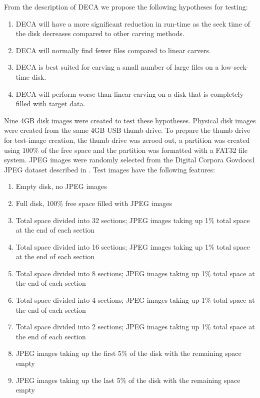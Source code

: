 \documentclass[final,5p,times,twocolumn,authoryear]{elsarticle}
\begin{document}
From the description of DECA we propose the following hypotheses for testing:
\begin{enumerate}
	\item DECA will have a more significant reduction in run-time as the seek time of the disk decreases compared to other carving methods.
	\item DECA will normally find fewer files compared to linear carvers.
	\item DECA is best suited for carving a small number of large files on a low-seek-time disk.
	\item DECA will perform worse than linear carving on a disk that is completely filled with target data.
\end{enumerate}

Nine 4GB disk images were created to test these hypotheses. Physical disk images were created from the same 4GB USB thumb drive. To prepare the thumb drive for test-image creation, the thumb drive was zeroed out, a partition was created using 100\% of the free space and the partition was formatted with a FAT32 file system. JPEG images were randomly selected from the Digital Corpora Govdocs1 JPEG dataset described in \cite{Garfinkel2009}. Test images have the following features:

\begin{enumerate}
	\item Empty disk, no JPEG images
	\item Full disk, 100\% free space filled with JPEG images
	\item Total space divided into 32 sections; JPEG images taking up 1\% total space at the end of each section
	\item Total space divided into 16 sections; JPEG images taking up 1\% total space at the end of each section
	\item Total space divided into 8 sections; JPEG images taking up 1\% total space at the end of each section
	\item Total space divided into 4 sections; JPEG images taking up 1\% total space at the end of each section
	\item Total space divided into 2 sections; JPEG images taking up 1\% total space at the end of each section
	\item JPEG images taking up the first 5\% of the disk with the remaining space empty
	\item JPEG images taking up the last 5\% of the disk with the remaining space empty
\end{enumerate}
\end{document}
